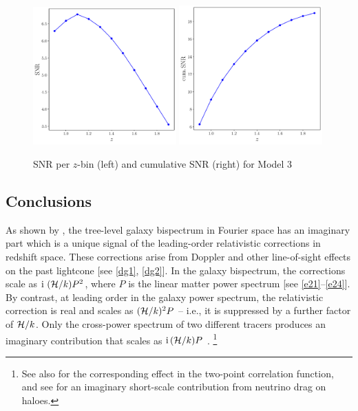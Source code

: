 \begin{figure}[!ht]
    \centering
    \includegraphics[width=0.49\textwidth]{fig/model3_perzbin.pdf}
    \includegraphics[width=0.49\textwidth]{fig/model3_cum.pdf}
    \caption{SNR per $z$-bin (left) and cumulative SNR (right) for Model 3}
\end{figure}


\subsection{Conclusions}


As shown by \cite{Clarkson:2018dwn}, the tree-level galaxy bispectrum in Fourier space has an imaginary part which is a unique signal of the leading-order relativistic corrections in redshift space. These corrections arise from Doppler and other line-of-sight effects on the past lightcone [see \eqref{dg1}, \eqref{dg2}]. In the galaxy bispectrum, the corrections scale as ${\mathrm{i\,}}\,(\mathcal{H}/k)P^2$, where $P$ is the linear matter power spectrum [see \eqref{e21}--\eqref{e24}]. By contrast,  at leading order in the galaxy power spectrum, the relativistic correction is real and scales as $(\mathcal{H}/k)^2P$ -- i.e., it is suppressed by a further factor of  $\mathcal{H}/k$. 
Only the cross-power spectrum of two different tracers produces an imaginary contribution that scales as ${\mathrm{i\,}}(\mathcal{H}/k)P$ \cite{McDonald:2009dh}.
\footnote{See also \cite{Bonvin:2013ogt, Bonvin:2015kuc, Gaztanaga:2015jrs, Irsic:2015nla, Hall:2016bmm,Lepori:2017twd,Bonvin:2018ckp, Lepori:2019cqp} for the corresponding effect in the two-point correlation function, and see \cite{Okoli:2016vmd} for an imaginary {short-scale} contribution from neutrino drag on haloes.}


